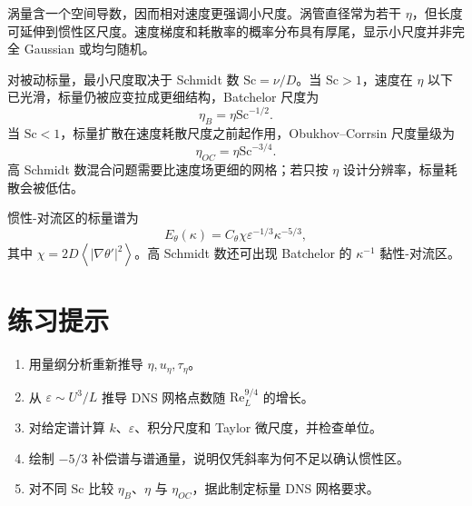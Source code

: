 \documentclass[12pt,a4paper,openany,fontset=none]{ctexbook}
\newcommand{\Rey}{\mathrm{Re}}
\newcommand{\avg}[1]{\left\langle #1\right\rangle}
\begin{document}
涡量含一个空间导数，因而相对速度更强调小尺度。涡管直径常为若干 $\eta$，但长度可延伸到惯性区尺度。速度梯度和耗散率的概率分布具有厚尾，显示小尺度并非完全 Gaussian 或均匀随机。

对被动标量，最小尺度取决于 Schmidt 数 $\mathrm{Sc}=\nu/D$。当 $\mathrm{Sc}>1$，速度在 $\eta$ 以下已光滑，标量仍被应变拉成更细结构，Batchelor 尺度为
\begin{equation}
 \eta_B=\eta\mathrm{Sc}^{-1/2}.
\end{equation}
当 $\mathrm{Sc}<1$，标量扩散在速度耗散尺度之前起作用，Obukhov--Corrsin 尺度量级为
\begin{equation}
 \eta_{OC}=\eta\mathrm{Sc}^{-3/4}.
\end{equation}
高 Schmidt 数混合问题需要比速度场更细的网格；若只按 $\eta$ 设计分辨率，标量耗散会被低估。

惯性-对流区的标量谱为
\begin{equation}
 E_\theta(\kappa)=C_\theta\chi\varepsilon^{-1/3}\kappa^{-5/3},
\end{equation}
其中 $\chi=2D\avg{|\nabla\theta'|^2}$。高 Schmidt 数还可出现 Batchelor 的 $\kappa^{-1}$ 黏性-对流区。

\section*{练习提示}
\begin{enumerate}
 \item 用量纲分析重新推导 $\eta,u_\eta,\tau_\eta$。
 \item 从 $\varepsilon\sim U^3/L$ 推导 DNS 网格点数随 $\Rey_L^{9/4}$ 的增长。
 \item 对给定谱计算 $k$、$\varepsilon$、积分尺度和 Taylor 微尺度，并检查单位。
 \item 绘制 $-5/3$ 补偿谱与谱通量，说明仅凭斜率为何不足以确认惯性区。
 \item 对不同 $\mathrm{Sc}$ 比较 $\eta_B$、$\eta$ 与 $\eta_{OC}$，据此制定标量 DNS 网格要求。
\end{enumerate}
\end{document}
